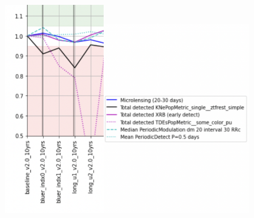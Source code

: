 \begin{enumerate}

\end{enumerate}
\begin{figure}
    \centering
    \includegraphics[width=1.7in]{figures/Filter_2.png}\includegraphics[width=2.5in]{figures/Filter1_Label.png}

\end{figure}
